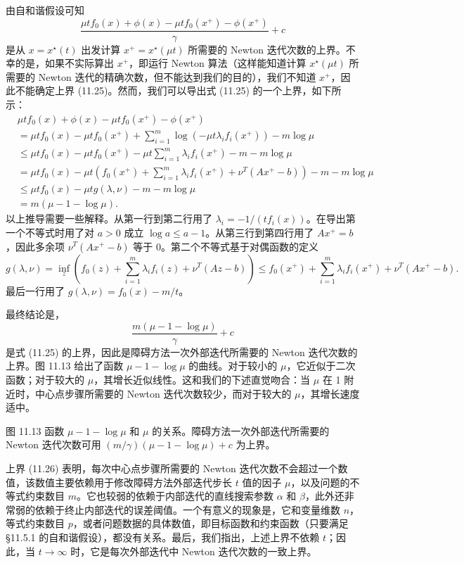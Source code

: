 \documentclass[UTF8,12pt,a4paper,fontset=fandol]{ctexart}
\begin{document}
由自和谐假设可知
\begin{equation}
\frac{\mu t f_0(x)+\phi(x)-\mu t f_0(x^+)-\phi(x^+)}{\gamma}+c
\tag{11.25}
\end{equation}
是从 $x=x^\star(t)$ 出发计算 $x^+=x^\star(\mu t)$ 所需要的 Newton 迭代次数的上界。不幸的是，如果不实际算出 $x^+$，即运行 Newton 算法（这样能知道计算 $x^\star(\mu t)$ 所需要的 Newton 迭代的精确次数，但不能达到我们的目的），我们不知道 $x^+$，因此不能确定上界 (11.25)。然而，我们可以导出式 (11.25) 的一个上界，如下所示：
\[
\begin{aligned}
&\mu t f_0(x)+\phi(x)-\mu t f_0(x^+)-\phi(x^+)\\
&=\mu t f_0(x)-\mu t f_0(x^+)+\sum_{i=1}^m\log(-\mu t\lambda_i f_i(x^+))-m\log\mu\\
&\leq \mu t f_0(x)-\mu t f_0(x^+)-\mu t\sum_{i=1}^m\lambda_i f_i(x^+)-m-m\log\mu\\
&=\mu t f_0(x)-\mu t\left(f_0(x^+)+\sum_{i=1}^m\lambda_i f_i(x^+)+\nu^T(Ax^+-b)\right)-m-m\log\mu\\
&\leq \mu t f_0(x)-\mu t g(\lambda,\nu)-m-m\log\mu\\
&=m(\mu-1-\log\mu).
\end{aligned}
\]
以上推导需要一些解释。从第一行到第二行用了 $\lambda_i=-1/(tf_i(x))$。在导出第一个不等式时用了对 $a>0$ 成立 $\log a\leq a-1$。从第三行到第四行用了 $Ax^+=b$，因此多余项 $\nu^T(Ax^+-b)$ 等于 0。第二个不等式基于对偶函数的定义
\[
g(\lambda,\nu)=\inf_z\left(f_0(z)+\sum_{i=1}^m\lambda_i f_i(z)+\nu^T(Az-b)\right)
\leq f_0(x^+)+\sum_{i=1}^m\lambda_i f_i(x^+)+\nu^T(Ax^+-b).
\]
最后一行用了 $g(\lambda,\nu)=f_0(x)-m/t$。

最终结论是，
\begin{equation}
\frac{m(\mu-1-\log\mu)}{\gamma}+c
\tag{11.26}
\end{equation}
是式 (11.25) 的上界，因此是障碍方法一次外部迭代所需要的 Newton 迭代次数的上界。图 11.13 给出了函数 $\mu-1-\log\mu$ 的曲线。对于较小的 $\mu$，它近似于二次函数；对于较大的 $\mu$，其增长近似线性。这和我们的下述直觉吻合：当 $\mu$ 在 1 附近时，中心点步骤所需要的 Newton 迭代次数较少，而对于较大的 $\mu$，其增长速度适中。

图 11.13 函数 $\mu-1-\log\mu$ 和 $\mu$ 的关系。障碍方法一次外部迭代所需要的 Newton 迭代次数可用 $(m/\gamma)(\mu-1-\log\mu)+c$ 为上界。

上界 (11.26) 表明，每次中心点步骤所需要的 Newton 迭代次数不会超过一个数值，该数值主要依赖用于修改障碍方法外部迭代步长 $t$ 值的因子 $\mu$，以及问题的不等式约束数目 $m$。它也较弱的依赖于内部迭代的直线搜索参数 $\alpha$ 和 $\beta$，此外还非常弱的依赖于终止内部迭代的误差阈值。一个有意义的现象是，它和变量维数 $n$，等式约束数目 $p$，或者问题数据的具体数值，即目标函数和约束函数（只要满足 \S11.5.1 的自和谐假设），都没有关系。最后，我们指出，上述上界不依赖 $t$；因此，当 $t\to\infty$ 时，它是每次外部迭代中 Newton 迭代次数的一致上界。
\end{document}
